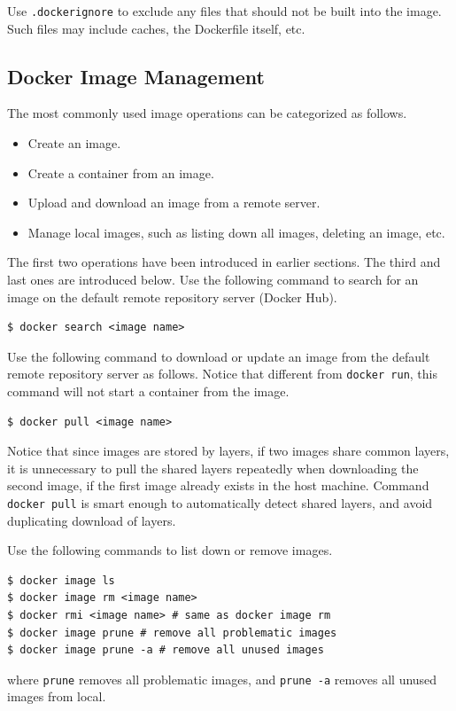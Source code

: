 Use \verb|.dockerignore| to exclude any files that should not be built into the image. Such files may include caches, the Dockerfile itself, etc.

\subsection{Docker Image Management}

The most commonly used image operations can be categorized as follows.
\begin{itemize}
  \item Create an image.
  \item Create a container from an image.
  \item Upload and download an image from a remote server.
  \item Manage local images, such as listing down all images, deleting an image, etc.
\end{itemize}

The first two operations have been introduced in earlier sections. The third and last ones are introduced below. Use the following command to search for an image on the default remote repository server (Docker Hub).
\begin{lstlisting}
$ docker search <image name>
\end{lstlisting}
Use the following command to download or update an image from the default remote repository server as follows. Notice that different from \verb|docker run|, this command will not start a container from the image.
\begin{lstlisting}
$ docker pull <image name>
\end{lstlisting}
Notice that since images are stored by layers, if two images share common layers, it is unnecessary to pull the shared layers repeatedly when downloading the second image, if the first image already exists in the host machine. Command \verb|docker pull| is smart enough to automatically detect shared layers, and avoid duplicating download of layers.

Use the following commands to list down or remove images.
\begin{lstlisting}
$ docker image ls
$ docker image rm <image name>
$ docker rmi <image name> # same as docker image rm
$ docker image prune # remove all problematic images
$ docker image prune -a # remove all unused images
\end{lstlisting}
where \verb|prune| removes all problematic images, and \verb|prune -a| removes all unused images from local.

